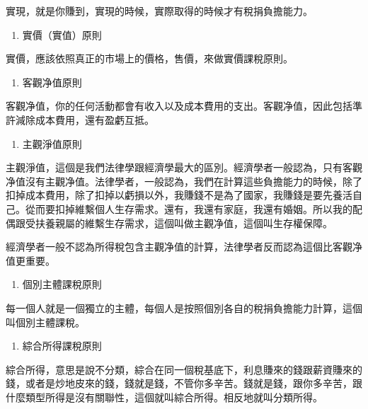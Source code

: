 \documentclass[]{ctexbook}
\providecommand{\tightlist}{%
  \setlength{\itemsep}{0pt}\setlength{\parskip}{0pt}}
\begin{document}
實現，就是你賺到，實現的時候，實際取得的時候才有稅捐負擔能力。

\begin{enumerate}
\def\labelenumi{\arabic{enumi}.}
\setcounter{enumi}{3}
\tightlist
\item
  實價（實值）原則
\end{enumerate}

實價，應該依照真正的市場上的價格，售價，來做實價課稅原則。

\begin{enumerate}
\def\labelenumi{\arabic{enumi}.}
\setcounter{enumi}{4}
\tightlist
\item
  客觀净值原則
\end{enumerate}

客觀净值，你的任何活動都會有收入以及成本費用的支出。客觀净值，因此包括準許減除成本費用，還有盈虧互抵。

\begin{enumerate}
\def\labelenumi{\arabic{enumi}.}
\setcounter{enumi}{5}
\tightlist
\item
  主觀淨值原則
\end{enumerate}

主觀淨值，這個是我們法律學跟經濟學最大的區別。經濟學者一般認為，只有客觀净值沒有主觀净值。法律學者，一般認為，我們在計算這些負擔能力的時候，除了扣掉成本費用，除了扣掉以虧損以外，我賺錢不是為了國家，我賺錢是要先養活自己。從而要扣掉維繫個人生存需求。還有，我還有家庭，我還有婚姻。所以我的配偶跟受扶養親屬的維繫生存需求，這個叫做主觀净值，這個叫生存權保障。

經濟學者一般不認為所得稅包含主觀净值的計算，法律學者反而認為這個比客觀净值更重要。

\begin{enumerate}
\def\labelenumi{\arabic{enumi}.}
\setcounter{enumi}{6}
\tightlist
\item
  個別主體課稅原則
\end{enumerate}

每一個人就是一個獨立的主體，每個人是按照個別各自的稅捐負擔能力計算，這個叫個別主體課稅。

\begin{enumerate}
\def\labelenumi{\arabic{enumi}.}
\setcounter{enumi}{7}
\tightlist
\item
  綜合所得課稅原則
\end{enumerate}

綜合所得，意思是說不分類，綜合在同一個稅基底下，利息賺來的錢跟薪資賺來的錢，或者是炒地皮來的錢，錢就是錢，不管你多辛苦。錢就是錢，跟你多辛苦，跟什麼類型所得是沒有關聯性，這個就叫綜合所得。相反地就叫分類所得。
\end{document}
